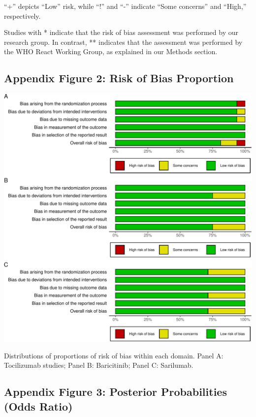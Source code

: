 \documentclass[
  12pt,
]{article}
\begin{document}
``+'' depicts ``Low'' risk, while ``!'' and ``-'' indicate ``Some
concerns'' and ``High,'' respectively.

Studies with * indicate that the risk of bias assessment was performed
by our research group. In contrast, ** indicates that the assessment was
performed by the WHO React Working Group, as explained in our Methods
section.

\hypertarget{appendix-figure-2-risk-of-bias-proportion}{%
\subsection{Appendix Figure 2: Risk of Bias
Proportion}\label{appendix-figure-2-risk-of-bias-proportion}}

\begin{center}\includegraphics{supplementary_material_files/figure-latex/unnamed-chunk-7-1} \end{center}

Distributions of proportions of risk of bias within each domain. Panel
A: Tocilizumab studies; Panel B: Baricitinib; Panel C: Sarilumab.

\newpage

\hypertarget{appendix-figure-3-posterior-probabilities-odds-ratio}{%
\subsection{Appendix Figure 3: Posterior Probabilities (Odds
Ratio)}\label{appendix-figure-3-posterior-probabilities-odds-ratio}}
\end{document}
